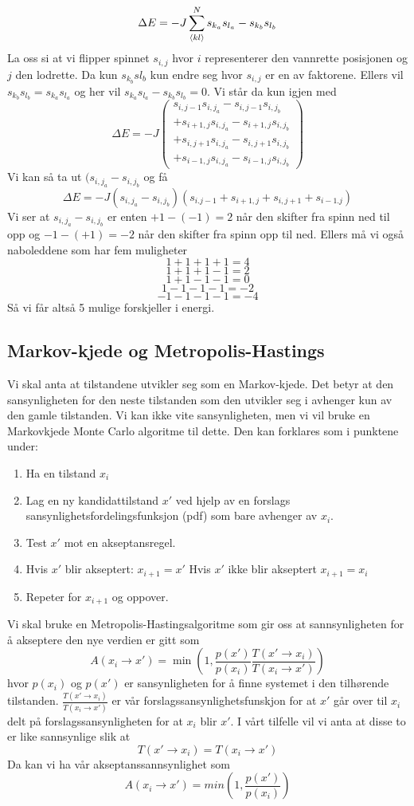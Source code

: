\documentclass[reprint,english,notitlepage]{revtex4-2}  %
\begin{document}
$$
\Delta E=-J\sum_{\expval{kl}}^{N} s_{k_a}s_{l_a}-s_{k_b}s_{l_b}
$$
La oss si at vi flipper spinnet $s_{i,j}$ hvor $i$ representerer den vannrette posisjonen og $j$ den lodrette. Da kun $s_{k_b}s{l_b}$ kun endre seg hvor $s_{i,j}$ er en av faktorene. Ellers vil $s_{k_b}s_{l_b}=s_{k_a}s_{l_a}$ og her vil $s_{k_a}s_{l_a}-s_{k_b}s_{l_b}=0$. Vi står da kun igjen med
$$
\Delta E= -J \begin{pmatrix} s_{i,j-1}s_{i,j_a}-s_{i,j-1}s_{i,j_b}\\+s_{i+1,j}s_{i,j_a}-s_{i+1,j}s_{i,j_b} \\+ s_{i,j+1}s_{i,j_a}-s_{i,j+1}s_{i,j_b}\\+s_{i-1,j}s_{i,j_a}-s_{i-1,j}s_{i,j_b}\end{pmatrix}
$$
Vi kan så ta ut $(s_{i,j_a}-s_{i,j_b}$ og få
$$
\Delta E=-J(s_{i,j_a}-s_{i,j_b})(
s_{i.j-1}+s_{i+1,j} +s_{i,j+1}+s_{i-1.j}
)
$$
Vi ser at $s_{i,j_a}-s_{i,j_b}$ er enten $+1-(-1)=2$ når den skifter fra spinn ned til opp og $-1-(+1)=-2$ når den skifter fra spinn opp til ned. Ellers må vi også naboleddene som har fem muligheter
$$
1+1+1+1=4
$$
$$
1+1+1-1=2
$$
$$
1+1-1-1=0
$$
$$
1-1-1-1=-2
$$
$$
-1-1-1-1=-4
$$
Så vi får altså 5 mulige forskjeller i energi.
\subsection{Markov-kjede og  Metropolis-Hastings}
Vi skal anta at tilstandene utvikler seg som en Markov-kjede. Det betyr at den sansynligheten for den neste tilstanden som den utvikler seg i avhenger kun av den gamle tilstanden. Vi kan ikke vite sansynligheten, men vi vil bruke en Markovkjede Monte Carlo algoritme til dette. Den kan forklares som i punktene under:
\begin{enumerate}
	\item Ha en tilstand $x_i$
	\item Lag en ny kandidattilstand $x'$ ved hjelp av en forslags sansynlighetsfordelingsfunksjon (pdf) som bare avhenger av $x_i$.
	\item Test $x'$ mot en akseptansregel.
	\item Hvis $x'$ blir akseptert: $x_{i+1}=x'$
	\newline Hvis $x'$ ikke blir akseptert $x_{i+1}=x_i$
	\item Repeter for $x_{i+1}$ og oppover.

\end{enumerate}
Vi skal bruke en Metropolis-Hastingsalgoritme som gir oss at sannsynligheten for å akseptere den nye verdien er gitt som
$$
A(x_i\rightarrow x')=\min(1, \frac{p(x')}{p(x_i)}\frac{T(x'\rightarrow x_i)}{T(x_i\rightarrow x')})
$$
hvor $p(x_i)$ og $p(x')$ er sansynligheten for å finne systemet i den tilhørende tilstanden. $\frac{T(x'\rightarrow x_i)}{T(x_i\rightarrow x')}$ er vår forslagssansynlighetsfunskjon for at $x'$ går over til $x_i$ delt på forslagssansynligheten for at $x_i$ blir $x'$. I vårt tilfelle vil vi anta at disse to er like sannsynlige slik at $$T(x'\rightarrow x_i)=T(x_i\rightarrow x')$$ Da kan vi ha vår akseptanssannsynlighet som
$$
A(x_i\rightarrow x')=min(1, \frac{p(x')}{p(x_i)})
$$
\end{document}
